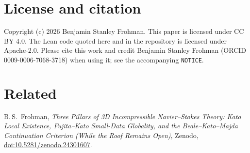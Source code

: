 \documentclass[11pt]{article}
\newcommand{\lean}[1]{\texttt{#1}}
\theoremstyle{definition}
\theoremstyle{remark}
\begin{document}
\section*{License and citation}
Copyright (c) 2026 Benjamin Stanley Frohman. This paper is licensed under CC BY 4.0. The Lean code quoted here and in the repository is licensed under Apache-2.0. Please cite this work and credit Benjamin Stanley Frohman (ORCID 0009-0006-7068-3718) when using it; see the accompanying \lean{NOTICE}.

\section*{Related}
B.\,S.\ Frohman, \emph{Three Pillars of 3D Incompressible Navier--Stokes Theory: Kato Local Existence, Fujita--Kato Small-Data Globality, and the Beale--Kato--Majda Continuation Criterion (While the Roof Remains Open)}, Zenodo, \href{https://doi.org/10.5281/zenodo.24301607}{doi:10.5281/zenodo.24301607}.
\end{document}

